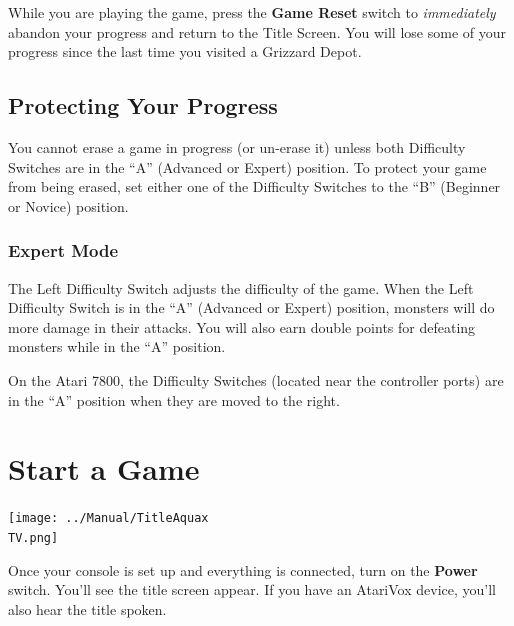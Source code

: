 \documentclass[10pt,twocolumn,openany,article]{memoir}
\newcommand\TV{NTSC} %
\begin{document}
While you are playing the game,  press the \textbf{Game Reset} switch to
\emph{immediately} abandon your progress and return to the Title Screen.
You will  lose some  of your  progress since the  last time  you visited
a Grizzard Depot.

\ifdefined\ATARIAGESAVE\vfill\fi

\ifdefined\NOSAVE\else

\subsection{Protecting Your Progress}

You  cannot erase  a  game  in progress  (or  un-erase  it) unless  both
Difficulty  Switches are  in the  ``A'' (Advanced  or Expert)  position.
To protect your game from being erased, set either one of the Difficulty
Switches to the ``B'' (Beginner or Novice) position.

\fi

\ifdefined\ATARIAGESAVE\vfill\fi

\subsubsection*{Expert Mode}

The Left Difficulty Switch adjusts the  difficulty of the game. When the
Left Difficulty  Switch is in  the ``A'' (Advanced or  Expert) position,
monsters will do more damage in their attacks. You will also earn double
points for defeating monsters while in the ``A'' position.

On the Atari 7800, the  Difficulty Switches (located near the controller
ports) are in the ``A'' position when they are moved to the right.

\ifdefined\ATARIAGESAVE\vfill\pagebreak\fi

\section{Start a Game}

\begin{center}
  \texttt{[image: ../Manual/TitleAquax\\TV.png]}
\end{center}

Once your  console is set  up and everything  is connected, turn  on the
\textbf{Power} switch. You'll  see the title screen appear.  If you have
an AtariVox device, you'll also hear the title spoken.
\end{document}
